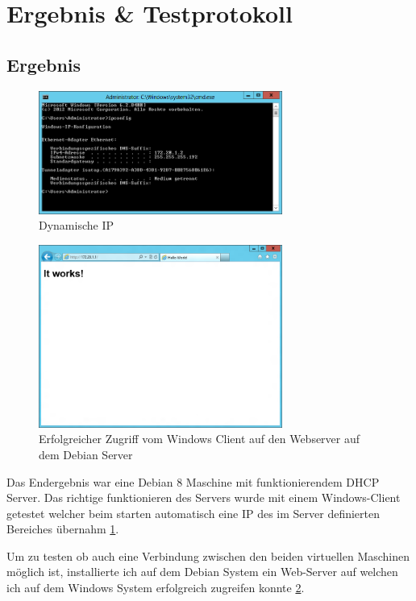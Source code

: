 \documentclass[12pt,a4paper,twoside,titlepage]{article}
\begin{document}
        \section{Ergebnis \& Testprotokoll}

        \subsection{Ergebnis}

        \begin{figure}
          \center
          \label{fig:dynip}
          \includegraphics[width=8cm]{cmd_ipconfig_dynamic_ip}
          \caption{Dynamische IP}
        \end{figure}

        \begin{figure}
          \center
          \label{fig:webserver}
          \includegraphics[width=8cm]{ie_web_example}
          \caption{Erfolgreicher Zugriff vom Windows Client auf den Webserver auf dem Debian Server}
        \end{figure}
        
        Das Endergebnis war eine Debian 8 Maschine mit funktionierendem DHCP Server. Das richtige funktionieren des Servers wurde mit einem Windows-Client getestet welcher beim starten automatisch eine IP des im Server definierten Bereiches übernahm \ref{fig:dynip}.

        Um zu testen ob auch eine Verbindung zwischen den beiden virtuellen Maschinen möglich ist, installierte ich auf dem Debian System ein Web-Server auf welchen ich auf dem Windows System erfolgreich zugreifen konnte \ref{fig:webserver}.
\end{document}
